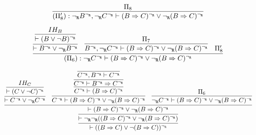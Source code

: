 \begin{enumerate}[(i)]
\begin{itemize}
            $$            
                \infer{
                    (\Pi'_8) : \ngr B^\ngr, \ngr C^\ngr \vdash (B \Rightarrow C)^\ngr \vee \ngr (B \Rightarrow C)^\ngr
                }{
                    \Pi_8
                }
            $$
            
            $$
            \infer{
                (\Pi_6) : \ngr C^\ngr \vdash (B \Rightarrow C)^\ngr \vee \ngr (B \Rightarrow C)^\ngr
            }{
                \infer{
                    \vdash B^\ngr \vee \ngr B^\ngr
                }{
                    \infer{
                        \vdash (B \vee \neg B)^\ngr
                    }{
                        IH_B
                    }
                }&
                \infer{
                    B^\ngr, \ngr C^\ngr \vdash (B \Rightarrow C)^\ngr \vee \ngr (B \Rightarrow C)^\ngr
                }{
                    \Pi_7
                }&
                \Pi'_8
            }  
            $$
            
            $$
            \infer{
                    \vdash ((B \Rightarrow C) \vee \neg (B \Rightarrow C))^\ngr
            }{
                \infer{
                    \vdash \ngr\ngr ((B \Rightarrow C)^\ngr \vee \ngr (B \Rightarrow C)^\ngr)
                }{
                    \infer{
                        \vdash (B \Rightarrow C)^\ngr \vee \ngr (B \Rightarrow C)^\ngr
                    }{
                        \infer{
                            \vdash C^\ngr \vee \ngr C^\ngr
                        }{
                            \infer{
                                \vdash (C \vee \neg C)^\ngr
                            }{
                                IH_C
                            }
                        }
                        &
                        \infer{
                            C^\ngr \vdash (B \Rightarrow C)^\ngr \vee \ngr (B \Rightarrow C)^\ngr
                        }{
                            \infer{
                                C^\ngr \vdash (B \Rightarrow C)^\ngr
                            }{
                                \infer{
                                    C^\ngr \vdash B^\ngr \Rightarrow C^\ngr
                                }{
                                    \infer{
                                        C^\ngr, B^\ngr \vdash C^\ngr
                                    }{
                                    }
                                }
                            }
                        }
                        &
                        \infer{
                            \ngr C^\ngr \vdash (B \Rightarrow C)^\ngr \vee \ngr (B \Rightarrow C)^\ngr
                        }{
                            \Pi_6
                        }
                    }
                }
            }
            $$


\end{itemize}
\end{enumerate}
